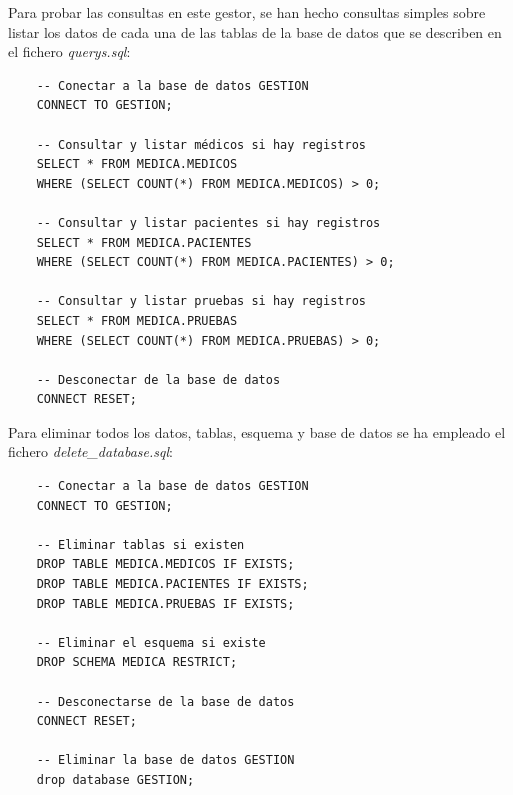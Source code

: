 \documentclass{article}
\begin{document}
Para probar las consultas en este gestor, se han hecho consultas simples sobre listar los datos de cada una de las tablas de la base de datos que se describen en el fichero \textit{querys.sql}:
\begin{verbatim}
    -- Conectar a la base de datos GESTION
    CONNECT TO GESTION;
    
    -- Consultar y listar médicos si hay registros
    SELECT * FROM MEDICA.MEDICOS
    WHERE (SELECT COUNT(*) FROM MEDICA.MEDICOS) > 0;
    
    -- Consultar y listar pacientes si hay registros
    SELECT * FROM MEDICA.PACIENTES
    WHERE (SELECT COUNT(*) FROM MEDICA.PACIENTES) > 0;
    
    -- Consultar y listar pruebas si hay registros
    SELECT * FROM MEDICA.PRUEBAS
    WHERE (SELECT COUNT(*) FROM MEDICA.PRUEBAS) > 0;
    
    -- Desconectar de la base de datos
    CONNECT RESET;    
\end{verbatim}

Para eliminar todos los datos, tablas, esquema y base de datos se ha empleado el fichero \textit{delete\_database.sql}:
\begin{verbatim}
    -- Conectar a la base de datos GESTION
    CONNECT TO GESTION;
    
    -- Eliminar tablas si existen
    DROP TABLE MEDICA.MEDICOS IF EXISTS;
    DROP TABLE MEDICA.PACIENTES IF EXISTS;
    DROP TABLE MEDICA.PRUEBAS IF EXISTS;
    
    -- Eliminar el esquema si existe
    DROP SCHEMA MEDICA RESTRICT;
    
    -- Desconectarse de la base de datos
    CONNECT RESET;
    
    -- Eliminar la base de datos GESTION
    drop database GESTION;
\end{verbatim}
\end{document}

